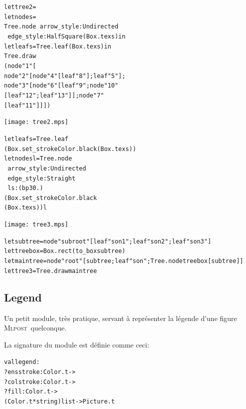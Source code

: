 \documentclass[a4paper,12pt]{article}
\newcommand{\mlpost}{\textsc{Mlpost}}
\begin{document}
\begin{minipage}{0.5\linewidth}
  \begin{alltt}
    let tree2 =
    let node s = 
    Tree.node ~arrow_style:Undirected 
    ~edge_style:HalfSquare (Box.tex s) in
    let leaf s = Tree.leaf (Box.tex s) in
    Tree.draw 
    (node "1" [
      node "2" [node "4" [leaf "8"]; leaf "5"]; 
      node "3" [node "6" [leaf "9"; node "10" 
          [leaf "12"; leaf "13"]];node "7" 
        [leaf "11"]]])
  \end{alltt}
\end{minipage}
\begin{minipage}{0.5\linewidth}
  \begin{center}
    \texttt{[image: tree2.mps]}
  \end{center}
\end{minipage}

\bigskip

\begin{minipage}{0.5\linewidth}
  \begin{alltt}
    let leaf s = Tree.leaf 
    (Box.set_stroke Color.black (Box.tex s))
    let node s l = Tree.node  
    ~arrow_style:Undirected 
    ~edge_style:Straight 
    ~ls:(bp 30.)
    (Box.set_stroke Color.black 
    (Box.tex s)) l
  \end{alltt}
\end{minipage}
\begin{minipage}{0.5\linewidth}
  \begin{center}
    \texttt{[image: tree3.mps]}
  \end{center}
\end{minipage}

\bigskip

\begin{alltt}
  let subtree = node "subroot" [leaf "son1"; leaf "son2"; leaf "son3"]
  let treebox = Box.rect (to_box subtree)
  let maintree = node "root" [subtree; leaf "son"; Tree.node treebox [subtree]]
  let tree3 = Tree.draw maintree 
\end{alltt}

\subsection{Legend}
Un petit module, très pratique, servant à représenter la légende d'une figure \mlpost\ quelconque.

La signature du module est définie comme ceci:
\begin{alltt}
  val legend : 
  ?ensstroke:Color.t ->
  ?colstroke:Color.t ->
  ?fill:Color.t ->
  (Color.t * string) list -> Picture.t
\end{alltt}
\end{document}
